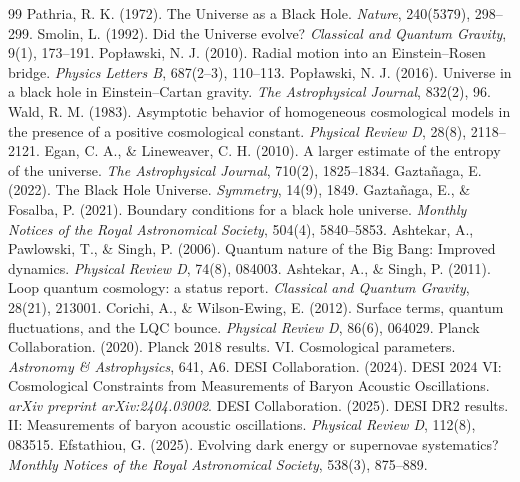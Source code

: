 \documentclass[11pt,a4paper]{article}
\begin{document}
\begin{thebibliography}{99}
 Pathria, R. K. (1972). The Universe as a Black Hole. \textit{Nature}, 240(5379), 298--299.
 Smolin, L. (1992). Did the Universe evolve? \textit{Classical and Quantum Gravity}, 9(1), 173--191.
 Pop{\l}awski, N. J. (2010). Radial motion into an Einstein--Rosen bridge. \textit{Physics Letters B}, 687(2--3), 110--113.
 Pop{\l}awski, N. J. (2016). Universe in a black hole in Einstein--Cartan gravity. \textit{The Astrophysical Journal}, 832(2), 96.
 Wald, R. M. (1983). Asymptotic behavior of homogeneous cosmological models in the presence of a positive cosmological constant. \textit{Physical Review D}, 28(8), 2118--2121.
 Egan, C. A., \& Lineweaver, C. H. (2010). A larger estimate of the entropy of the universe. \textit{The Astrophysical Journal}, 710(2), 1825--1834.
 Gazta\~naga, E. (2022). The Black Hole Universe. \textit{Symmetry}, 14(9), 1849.
 Gazta\~naga, E., \& Fosalba, P. (2021). Boundary conditions for a black hole universe. \textit{Monthly Notices of the Royal Astronomical Society}, 504(4), 5840--5853.
 Ashtekar, A., Pawlowski, T., \& Singh, P. (2006). Quantum nature of the Big Bang: Improved dynamics. \textit{Physical Review D}, 74(8), 084003.
 Ashtekar, A., \& Singh, P. (2011). Loop quantum cosmology: a status report. \textit{Classical and Quantum Gravity}, 28(21), 213001.
 Corichi, A., \& Wilson-Ewing, E. (2012). Surface terms, quantum fluctuations, and the LQC bounce. \textit{Physical Review D}, 86(6), 064029.
 Planck Collaboration. (2020). Planck 2018 results. VI. Cosmological parameters. \textit{Astronomy \& Astrophysics}, 641, A6.
 DESI Collaboration. (2024). DESI 2024 VI: Cosmological Constraints from Measurements of Baryon Acoustic Oscillations. \textit{arXiv preprint arXiv:2404.03002}.
 DESI Collaboration. (2025). DESI DR2 results. II: Measurements of baryon acoustic oscillations. \textit{Physical Review D}, 112(8), 083515.
 Efstathiou, G. (2025). Evolving dark energy or supernovae systematics? \textit{Monthly Notices of the Royal Astronomical Society}, 538(3), 875--889.
\end{thebibliography}
\end{document}
